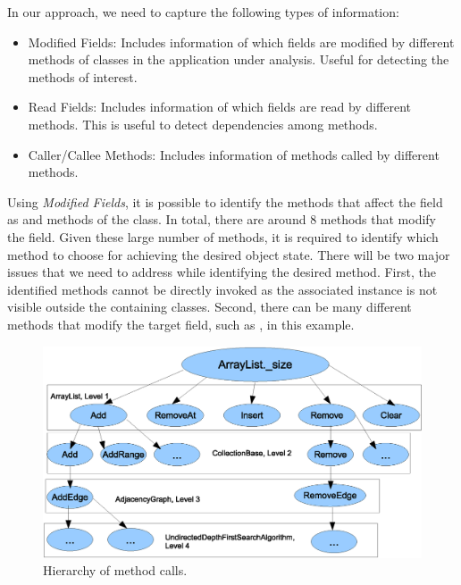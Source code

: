 In our approach, we need to capture the following types of information:

\begin{itemize}
\item Modified Fields: Includes information of which fields are modified by different methods of classes in the application under analysis. Useful for detecting the methods of interest.
\item Read Fields: Includes information of which fields are read by different methods. This is useful to detect dependencies among methods.
\item Caller/Callee Methods: Includes information of methods called by different methods.
\end{itemize}

Using \emph{Modified Fields}, it is possible to identify the methods that affect the  field as  and  methods of the  class. In total, there are around $8$ methods that modify the  field. Given these large number of methods, it is required to identify which method to choose for achieving the desired object state. There will be two major issues that we need to address while identifying the desired method. First, the identified methods cannot be directly invoked as the associated instance is not visible outside the containing classes. Second, there can be many different methods that modify the target field, such as , in this example.

\begin{figure}[t]
\centering
\includegraphics[scale=0.60,clip]{figs/MethodChaining1.eps}
\caption{\label{fig:mchain}Hierarchy of method calls.}
\end{figure}

